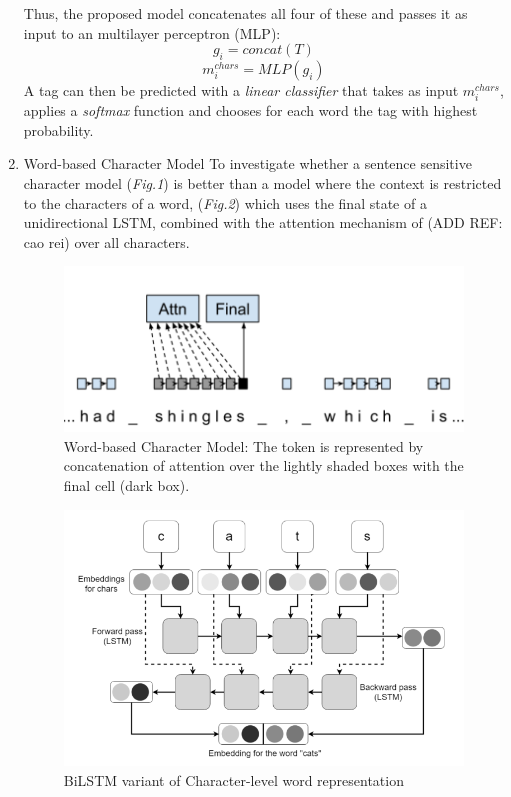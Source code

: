 \documentclass[11pt]{article}
\begin{document}
\begin{enumerate}
Thus, the proposed model concatenates all four of these and passes it as input to an multilayer perceptron (MLP):
\[
g_{i} = concat(T)
\]
\[
m_{i}^{chars} = MLP(g_{i})
\]
A tag can then be predicted with a \emph{linear classifier} that takes as input \(m_{i}^{chars}\), applies a \emph{softmax} function and chooses for each word the tag with highest probability.
\item Word-based Character Model
\label{sec:orgf269536}
To investigate whether a sentence sensitive character model (\emph{Fig.1}) is better than a model where the context is restricted to the characters of a word, (\emph{Fig.2}) which uses the final state of a unidirectional LSTM, combined with the attention mechanism of (ADD REF: cao rei) over all characters.

\begin{figure}[htbp]
\centering
\includegraphics[width=.9\linewidth]{assets/nnfl1b.png}
\caption{Word-based Character Model: The token is represented by concatenation of attention over the lightly shaded boxes with the final cell (dark box).}
\end{figure}

\begin{figure}[htbp]
\centering
\includegraphics[width=.9\linewidth]{assets/nnfl1.png}
\caption{BiLSTM variant of Character-level word representation}
\end{figure}


\end{enumerate}
\end{document}
